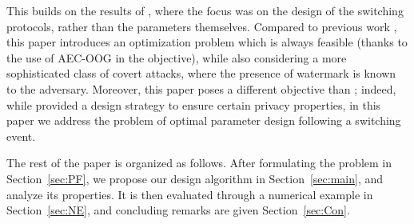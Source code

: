 This builds on the results of \cite{ferrari2020switching}, where the focus was on the design of the switching protocols, rather than the parameters themselves.
Compared to previous work \citep{gallo2021design}, this paper introduces an optimization problem which is always feasible (thanks to the use of AEC-OOG in the objective), while also considering a more sophisticated class of covert attacks, where the presence of watermark is known to the adversary. 
Moreover, this paper poses a different objective than \citep{zhang2023hybrid}; indeed, while \citep{zhang2023hybrid} provided a design strategy to ensure certain privacy properties, in this paper we address the problem of optimal parameter design following a switching event.


The rest of the paper is organized as follows. 
After formulating the problem in Section~\ref{sec:PF}, we propose our design algorithm in Section~\ref{sec:main}, and analyze its properties. It is then evaluated through a numerical example in Section~\ref{sec:NE}, and concluding remarks are given Section~\ref{sec:Con}.
